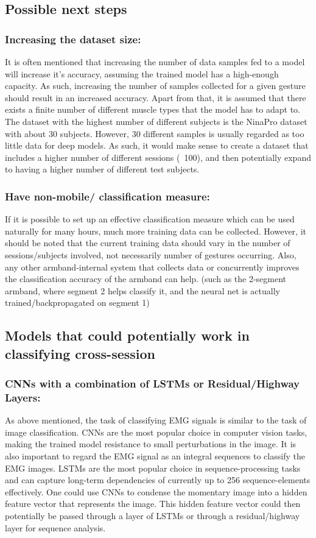 \documentclass{article}
\begin{document}
\subsection{Possible next steps} 

\subsubsection{Increasing the dataset size:} It is often mentioned that increasing the number of data samples fed to a model will increase it's accuracy, assuming the trained model has a high-enough capacity. As such, increasing the number of samples collected for a given gesture should result in an increased accuracy. Apart from that, it is assumed that there exists a finite number of different muscle types that the model has to adapt to. The dataset with the highest number of different subjects is the NinaPro dataset with about 30 subjects. However, 30 different samples is usually regarded as too little data for deep models. As such, it would make sense to create a dataset that includes a higher number of different sessions (~100), and then potentially expand to having a higher number of different test subjects.
\subsubsection{Have non-mobile/ classification measure:} If it is possible to set up an effective classification measure which can be used naturally for many hours, much more training data can be collected. However, it should be noted that the current training data should vary in the number of sessions/subjects involved, not necessarily number of gestures occurring. Also, any other armband-internal system that collects data or concurrently improves the classification accuracy of the armband can help. (such as the 2-segment armband, where segment 2 helps classify it, and the neural net is actually trained/backpropagated on segment 1)

\subsection{Models that could potentially work in classifying cross-session}
\subsubsection{CNNs with a combination of LSTMs or Residual/Highway Layers:} As above mentioned, the task of classifying EMG signals is similar to the task of image classification. CNNs are the most popular choice in computer vision tasks, making the trained model resistance to small perturbations in the image. 
It is also important to regard the EMG signal as an integral sequences to classify the EMG images. LSTMs are the most popular choice in sequence-processing tasks and can capture long-term dependencies of currently up to 256 sequence-elements effectively. 
One could use CNNs to condense the momentary image into a hidden feature vector that represents the image. This hidden feature vector could then potentially be passed through a layer of LSTMs or through a residual/highway layer for sequence analysis.
\end{document}
